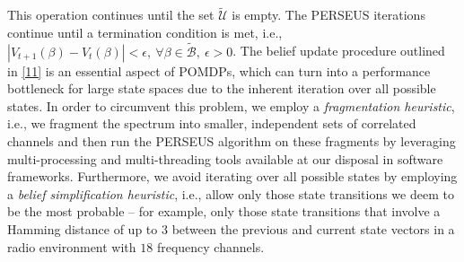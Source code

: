 \documentclass[10pt,twocolumn]{IEEEtran}
\begin{document}
This operation continues until the set $\tilde{\mathcal{U}}$ is empty. The PERSEUS iterations continue until a termination condition is met, i.e., $|V_{t{+}1}(\beta){-}V_{t}(\beta)|{<}\epsilon,\ \forall \beta{\in} \tilde{\mathcal{B}},\ \epsilon{>}0$. The belief update procedure outlined in \eqref{11} is an essential aspect of POMDPs, which can turn into a performance bottleneck for large state spaces due to the inherent iteration over all possible states. In order to circumvent this problem, we employ a \emph{fragmentation heuristic}, i.e., we fragment the spectrum into smaller, independent sets of correlated channels and then run the PERSEUS algorithm on these fragments by leveraging multi-processing and multi-threading tools available at our disposal in software frameworks. Furthermore, we avoid iterating over all possible states by employing a \emph{belief simplification heuristic}, i.e., allow only those state transitions we deem to be the most probable -- for example, only those state transitions that involve a Hamming distance of up to $3$ between the previous and current state vectors in a radio environment with $18$ frequency channels.
\vspace{-4mm}
\end{document}
